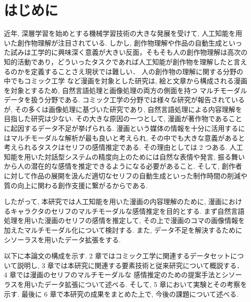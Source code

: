 \newpage
\changeindent{0cm}
\section{はじめに}
\changeindent{2cm}
近年, 深層学習を始めとする機械学習技術の大きな発展を受けて, 人工知能を用いた創作物理解が注目されている.
しかし, 創作物理解や作品の自動生成といった試みは工学的に興味深く意義が大きい反面，そもそも人の創作物理解は高次の知的活動であり，どういったタスクであれば人工知能が創作物を理解したと言えるのかを定義することさえ現状では難しい．
人の創作物の理解に関する分野の中でもコミック工学 \cite{comic} など漫画を対象とした研究は,
絵と文章から構成される漫画を対象とするため, 自然言語処理と画像処理の両方の側面を持つ
マルチモーダルデータを扱う分野である.
コミック工学の分野では様々な研究が報告されているが,
その多くは画像処理に基づいた研究であり,
自然言語処理による内容理解を目指した研究は少ない.
その大きな原因の一つとして, 漫画が著作物であることに起因するデータ不足が挙げられる.
漫画という媒体の情報を十分に活用するにはマルチモーダルな解析が最も良いと考えられ, その中でも大きな意義があると考えられるタスクはセリフの感情推定である. その理由としては 2 つある. 人工知能を用いた対話型システムの精度向上のためには自然な表情や発言, 振る舞いから人の潜在的な感情を推定できるようになる必要があること. そして, 創作者に対して作品の展開を汲んだ適切なセリフの自動生成といった制作時間の削減や質の向上に関わる創作支援に繋がるからである.

したがって, 本研究では人工知能を用いた漫画の内容理解のために,
漫画におけるキャラクタのセリフのマルチモーダルな感情推定を目的とする.
まず自然言語処理を用いた漫画のセリフの感情を推定して,
その上で漫画のコマの画像情報を加えたマルチモーダル化について検討する. また, データ不足を解決するために
シソーラスを用いたデータ拡張をする.

以下に本論文の構成を示す.
2 章ではコミック工学に関連するデータセットについて説明し,
3 章では本研究に関連する要素技術と従来研究について概説する．
4 章では漫画のセリフのマルチモーダルな
感情推定のための提案手法とシソーラスを用いたデータ拡張について述べる.
そして, 5 章において実験とその考察を示す.
最後に 6 章で本研究の成果をまとめた上で, 今後の課題について述べる.
